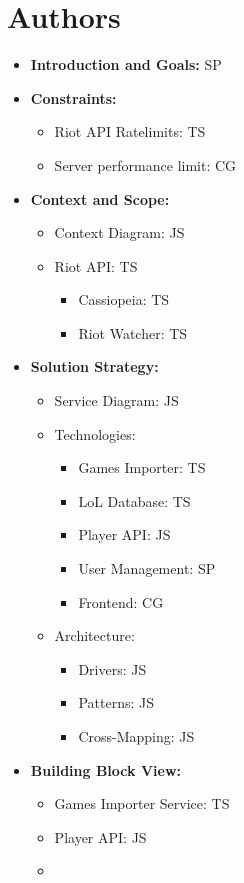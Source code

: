 \section{Authors}
\begin{itemize}
\item
\textbf{Introduction and Goals:} SP
\item
\textbf{Constraints:}
	\begin{itemize}
	\item
	Riot API Ratelimits: TS
	\item
	Server performance limit: CG
	\end{itemize}
\item
\textbf{Context and Scope:}
	\begin{itemize}
	\item
	Context Diagram: JS
	\item
	Riot API: TS
	\begin{itemize}
		\item
		Cassiopeia: TS
		\item
		Riot Watcher: TS
	\end{itemize}
	\end{itemize}
\item
\textbf{Solution Strategy:}
\begin{itemize}
	\item
	Service Diagram: JS
	\item
	Technologies:
	\begin{itemize}
		\item
		Games Importer: TS
		\item
		LoL Database: TS
		\item
		Player API: JS
		\item
		User Management: SP
		\item
		Frontend: CG
	\end{itemize}
	\item
	Architecture:
	\begin{itemize}
	\item
	Drivers: JS
	\item
	Patterns: JS
	\item
	Cross-Mapping: JS
	\end{itemize}
\end{itemize}
\item
\textbf{Building Block View:}
\begin{itemize}
	\item
	Games Importer Service: TS
	\item
	Player API: JS
	\item

\end{itemize}
\end{itemize}
